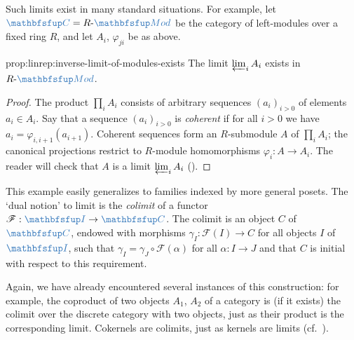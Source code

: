 Such limits exist in many standard situations. For example, let
$\categ{C} = R\text{-}\categ{Mod}$ be the category of left-modules
over a fixed ring $R$, and let $A_i$, $\varphi_{ji}$ be as above.
\begin{prop}{}{prop:linrep:inverse-limit-of-modules-exists}
  The limit $\varprojlim_i A_i$ exists in $R\text{-}\categ{Mod}$.
\end{prop}
\begin{proof}
  The product $\prod_i A_i$ consists of arbitrary sequences
  $(a_i)_{i > 0}$ of elements $a_i \in A_i$. Say that a sequence
  $(a_i)_{i > 0}$ is \emph{coherent} if for all $i > 0$ we have
  $a_i = \varphi_{i,i+1}(a_{i+1})$. Coherent sequences form an
  $R$-submodule $A$ of $\prod_i A_i$; the canonical projections
  restrict to $R$-module homomorphisms $\varphi_i : A \to A_i$. The
  reader will check that $A$ is a limit $\varprojlim_i A_i$
  ().
\end{proof}
This example easily generalizes to families indexed by more general
posets.  The `dual notion' to limit is the \emph{colimit} of a functor
$\mathscr{F} : \categ{I} \to \categ{C}$. The colimit is an object $C$
of $\categ{C}$, endowed with morphisms
$\gamma_I : \mathscr{F}(I) \to C$ for all objects $I$ of $\categ{I}$,
such that $\gamma_I = \gamma_J \circ \mathscr{F}(\alpha)$ for all
$\alpha : I \to J$ and that $C$ is initial with respect to this
requirement.

Again, we have already encountered several instances of this
construction: for example, the coproduct of two objects $A_1$, $A_2$
of a category is (if it exists) the colimit over the discrete category
with two objects, just as their product is the corresponding
limit. Cokernels are colimits, just as kernels are limits (cf.\
).


